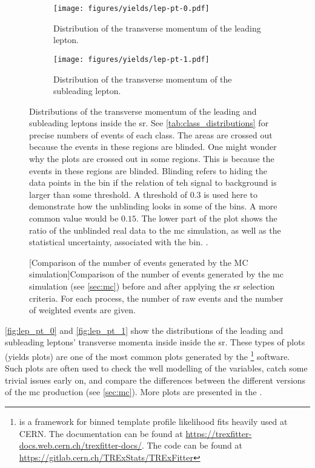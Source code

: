 \begin{figure}[htb]
    \centering
    \begin{subfigure}{0.45\textwidth}
        \texttt{[image: figures/yields/lep-pt-0.pdf]}
        \caption{Distribution of the transverse momentum of the leading lepton.}
        \label{fig:lep_pt_0}
    \end{subfigure}\hfill%
    \begin{subfigure}{0.45\textwidth}
        \texttt{[image: figures/yields/lep-pt-1.pdf]}
        \caption{Distribution of the transverse momentum of the subleading lepton.}
        \label{fig:lep_pt_1}
    \end{subfigure}
    \caption[Distributions of the transverse momentum of the leading and subleading leptons inside the Signal Region.]
    {Distributions of the transverse momentum of the leading and subleading leptons inside the \gls{sr}. See
        \autoref{tab:class_distributions} for precise numbers of events of each class. The areas are crossed out because
        the events in these regions are blinded.  One might wonder why the plots are crossed out in some regions. This
        is because the events in these regions are blinded.  Blinding refers to hiding the data points in the bin if the
        relation of teh signal to background is larger than some threshold. A threshold of $0.3$ is used here to
        demonstrate how the unblinding looks in some of the bins. A more common value would be $0.15$. The lower part of
        the plot shows the ratio of the unblinded real data to the \gls{mc} simulation, as well as the statistical
        uncertainty, associated with the bin. .}
\end{figure}

\begin{figure}[htb]
    \centering
    
    [Comparison of the number of events generated by the MC simulation]{Comparison of the number of events generated by the \gls{mc} simulation (see \autoref{sec:mc})
        before and after applying the \gls{sr} selection criteria. For each process, the number of raw events
        and the number of weighted events are given.}
    \label{tab:class_distributions}
\end{figure}


\autoref{fig:lep_pt_0} and \autoref{fig:lep_pt_1} show the distributions of the leading and
subleading leptons' transverse momenta inside inside the \gls{sr}. These types of plots (yields plots) are one of the
most common plots generated by the \trex\footnote{\trex is a framework for binned template profile likelihood fits
    heavily used at CERN. The documentation can be found at \url{https://trexfitter-docs.web.cern.ch/trexfitter-docs/}.
    The code can be found at \url{https://gitlab.cern.ch/TRExStats/TRExFitter}} software. Such plots are often used to
check the well modelling of the variables, catch some trivial issues early on, and compare the differences between
the different versions of the \gls{mc} production (see \autoref{sec:mc}). More plots are presented in the
.




